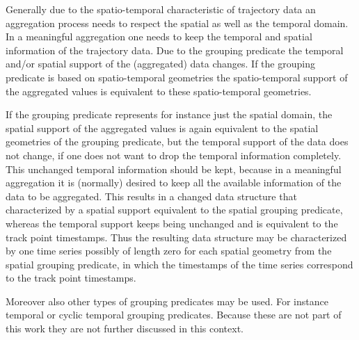 \documentclass[12pt, oneside, a4paper]{scrbook}
\begin{document}
Generally due to the spatio-temporal characteristic of trajectory data an aggregation process needs to respect the spatial as well as the temporal domain. 
In a meaningful aggregation one needs to keep the temporal and spatial information of the trajectory data. Due to the grouping predicate the temporal and/or spatial support of the (aggregated) data changes.
If the grouping predicate is based on spatio-temporal geometries the spatio-temporal support of the aggregated values is equivalent to these spatio-temporal geometries.
\par\medskip
If the grouping predicate represents for instance just the spatial domain, the spatial support of the aggregated values is again equivalent to the spatial geometries of the grouping predicate, but the temporal support of the data does not change, if one does not want to drop the temporal information completely.
This unchanged temporal information should be kept, because in a meaningful aggregation it is (normally) desired to keep all the available information of the data to be aggregated.
This results in a changed data structure that characterized by a spatial support equivalent to the spatial grouping predicate, whereas the temporal support keeps being unchanged and is equivalent to the track point timestamps.
Thus the resulting data structure may be characterized by one time series possibly of length zero for each spatial geometry from the spatial grouping predicate, in which the timestamps of the time series correspond to the track point timestamps.
\par\medskip
Moreover also other types of grouping predicates may be used. For instance temporal or cyclic temporal grouping predicates. Because these are not part of this work they are not further discussed in this context.
\par\medskip
\end{document}
